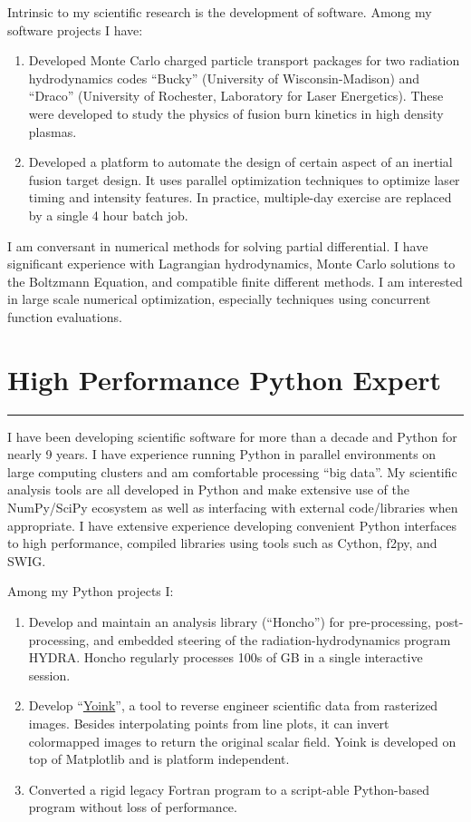 \documentclass[letterpaper,11pt]{article}
\newcommand{\sectionline}{\vspace{-0.05in}\hrule\vspace{0.05in}}
\begin{document}
Intrinsic to my scientific research is the development of software.  Among my
software projects I have:
\begin{enumerate}
	\item Developed Monte Carlo charged particle transport packages for two
		radiation hydrodynamics codes ``Bucky'' (University of
		Wisconsin-Madison) and ``Draco'' (University of Rochester, Laboratory
		for Laser Energetics).  These were
		developed to study the physics of fusion burn kinetics in high density
		plasmas.
	\item Developed a platform to automate the design of certain aspect of an
		inertial fusion target design.  It uses parallel optimization
		techniques to optimize laser timing and intensity features.  In
		practice, multiple-day exercise are replaced by a single 4 hour batch
		job.
\end{enumerate}

I am conversant in numerical methods for solving partial differential.
I have significant experience with Lagrangian hydrodynamics, Monte Carlo
solutions to the Boltzmann Equation, and compatible finite different
methods.  I am interested in large scale numerical
optimization, especially techniques using concurrent function evaluations.


\section*{High Performance Python Expert}
\sectionline
I have been developing scientific software for more than a decade and Python
for nearly 9 years.  I have experience running Python in parallel environments
on large computing clusters and am comfortable processing ``big data''.  My
scientific analysis tools are all developed in Python and make extensive use of
the NumPy/SciPy ecosystem as well as interfacing with external code/libraries
when appropriate.  I have extensive experience developing convenient Python
interfaces to high performance, compiled libraries using tools such as Cython,
f2py, and SWIG.

Among my Python projects I:
\begin{enumerate}
	\item Develop and maintain an analysis library (``Honcho'') for pre-processing, post-processing,
		and embedded steering of the radiation-hydrodynamics program HYDRA\@.
		Honcho regularly processes 100s of GB in a single interactive session.
	\item Develop ``\hyperref[https://github.com/mrterry/yoink]{Yoink}'', a tool to reverse engineer scientific data from
		rasterized images.  Besides interpolating points from line plots, it
		can invert colormapped images to return the original scalar field.
		Yoink is developed on top of Matplotlib and is platform independent.
	\item Converted a rigid legacy Fortran program to a script-able
		Python-based program without loss of performance.
\end{enumerate}
\end{document}
